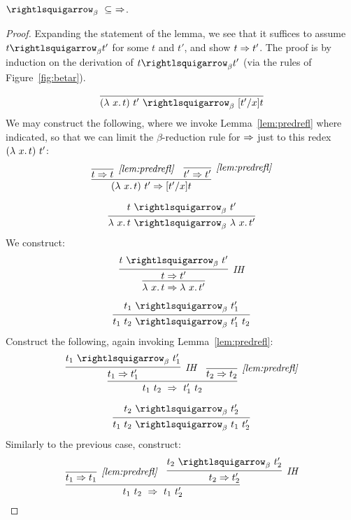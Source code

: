 \begin{lemma}
  \label{lem:betapar}
  $\betaa_\beta\ \subseteq\ \Pred$.
\end{lemma}
\begin{proof}
  Expanding the statement of the lemma, we see that it suffices to assume $t \betaa_\beta t'$ for some $t$ and $t'$,
  and show $t \Rightarrow t'$.  The proof is by induction on the derivation of $t \betaa_\beta t'$ (via the rules of Figure~\ref{fig:betar}).

  \case{ }
  \[
  \infer{(\lam{x}{t})\ t'\ \curva_\beta\ [t'/x]t}{\ }
  \]
  \noindent We may construct the following, where we invoke Lemma~\ref{lem:predrefl} where indicated, so that we can limit
  the $\beta$-reduction rule for $\Rightarrow$ just to this redex $(\lambda\ x.\, t)\ t'$:
  \[
  \infer{(\lam{x}{t})\ t' \Pred [t'/x]t}
        {\infer[\textit{\ref{lem:predrefl}}]{t \Pred t}{\ } & \infer[\textit{\ref{lem:predrefl}}]{t' \Pred t'}{\ }}
  \]
        

  \case{ }
  \[
  \infer{\lam{x}{t}\ \curva_\beta\ \lam{x}{t'}}{t\ \curva_\beta\ t'}
  \]
  \noindent We construct:
  \[
  \infer{\lam{x}{t} \Pred \lam{x}{t'}}{\infer[\textit{IH}]{t \Pred t'}{t\ \curva_\beta\ t'}}
  \]

  \case{ }
  \[
  \infer{t_1\ t_2\ \curva_\beta\ t_1'\ t_2}{t_1\ \curva_\beta\ t_1'}
  \]
  \noindent Construct the following, again invoking Lemma~\ref{lem:predrefl}:
  \[
  \infer{t_1\ t_2\ \Pred\ t_1'\ t_2}{\infer[\textit{IH}]{t_1 \Pred t_1'}{t_1\ \curva_\beta\ t_1'} &
                                    \infer[\textit{\ref{lem:predrefl}}]{t_2 \Pred t_2}{\ }}
  \]

  \case{ }
  \[
  \infer{t_1\ t_2\ \curva_\beta\ t_1\ t_2'}{t_2\ \curva_\beta\ t_2'}
  \]
  \noindent Similarly to the previous case, construct:
  \[
  \infer{t_1\ t_2\ \Pred\ t_1\ t_2'}{\infer[\textit{\ref{lem:predrefl}}]{t_1 \Pred t_1}{\ }&
                                    \infer[\textit{IH}]{t_2 \Pred t_2'}{t_2\ \curva_\beta\ t_2'} }
  \]
  
        
  \end{proof}

